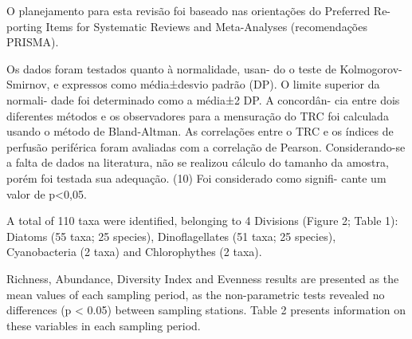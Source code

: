 \begin{multicols}{3}

\par{}O planejamento para esta revisão foi
baseado nas orientações do Preferred Re-
porting Items for Systematic Reviews and
Meta-Analyses (recomendações PRISMA).
\par{}Os dados foram testados quanto à normalidade, usan-
do o teste de Kolmogorov-Smirnov, e expressos como
média±desvio padrão (DP). O limite superior da normali-
dade foi determinado como a média±2 DP. A concordân-
cia entre dois diferentes métodos e os observadores para
a mensuração do TRC foi calculada usando o método de
Bland-Altman. As correlações entre o TRC e os índices de
perfusão periférica foram avaliadas com a correlação de
Pearson. Considerando-se a falta de dados na literatura,
não se realizou cálculo do tamanho da amostra, porém foi
testada sua adequação. (10) Foi considerado como signifi-
cante um valor de p<0,05.

\lipsum
{}


\par{}A total of 110 taxa were identified, belonging to
4 Divisions (Figure 2; Table 1): Diatoms (55 taxa;
25 species), Dinoflagellates (51 taxa; 25 species),
Cyanobacteria (2 taxa) and Chlorophythes (2 taxa).
\par{}Richness, Abundance, Diversity Index and Evenness
results are presented as the mean values of each sampling
period, as the non-parametric tests revealed no differences
(p < 0.05) between sampling stations. Table 2 presents
information on these variables in each sampling period.


\lipsum



\lipsum


\lipsum
\lipsum


\end{multicols}
